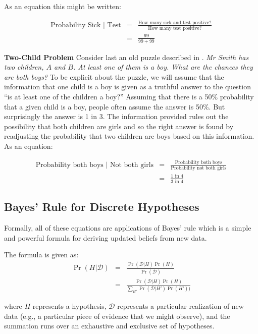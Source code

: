 \documentclass[
  12pt,
]{book}
\begin{document}
As an equation this might be written:

\begin{align*} 
\text{Probability Sick | Test} &=& \frac{\text{How many sick and test positive?}}{\text{How many test positive?}}\\ 
&=& \frac{99}{99 + 99}
\end{align*}

\textbf{Two-Child Problem} Consider last an old puzzle described in \citet{gardner1961second}. \emph{Mr Smith has two children, \(A\) and \(B\). At least one of them is a boy. What are the chances they are both boys?}
To be explicit about the puzzle, we will assume that the information that one child is a boy is given as a truthful answer to the question ``is at least one of the children a boy?'' Assuming that there is a 50\% probability that a given child is a boy, people often assume the answer is 50\%. But surprisingly the answer is 1 in 3. The information provided rules out the possibility that both children are girls and so the right answer is found by readjusting the probability that two children are boys based on this information. As an equation:

\begin{align*} 
\text{Probability both boys | Not both girls} &=& \frac{\text{Probability  both boys}}{\text{Probability not both girls}} \\ 
&=& \frac{\text{1 in 4}}{\text{3 in 4}}
\end{align*}

\hypertarget{bayes-rule-for-discrete-hypotheses}{%
\subsection{Bayes' Rule for Discrete Hypotheses}\label{bayes-rule-for-discrete-hypotheses}}

Formally, all of these equations are applications of Bayes' rule which is a simple and powerful formula for deriving updated beliefs from new data.

The formula is given as:
\begin{eqnarray}
\Pr(H|\mathcal{D})&=&\frac{\Pr(\mathcal{D}|H)\Pr(H)}{\Pr(\mathcal{D})}\\
                  &=&\frac{\Pr(\mathcal{D}|H)\Pr(H)}{\sum_{H'}\Pr(\mathcal{D}|H')\Pr(H'))}
\end{eqnarray}

where \(H\) represents a hypothesis, \(\mathcal{D}\) represents a particular realization of new data (e.g., a particular piece of evidence that we might observe), and the summation runs over an exhaustive and exclusive set of hypotheses.
\end{document}
